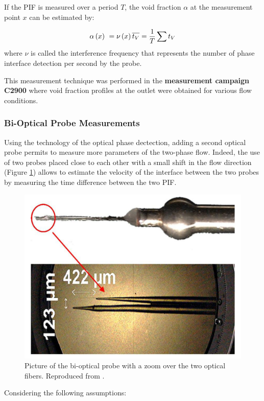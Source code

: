 If the PIF is measured over a period $T$, the void fraction $\alpha$ at the measurement point $x$ can be estimated by:


\begin{equation}
\alpha\left( x \right)\ = \nu\left( x \right) \overline{t_{V}} = \frac{1}{T} \sum t_{V}
\end{equation}
where $\nu$ is called the interference frequency that represents the number of phase interface detection per second by the probe.

\begin{remark*}{}
This measurement technique was performed in the \textbf{measurement campaign C2900} where void fraction profiles at the outlet were obtained for various flow conditions.
\end{remark*}

\subsubsection{Bi-Optical Probe Measurements}


Using the technology of the optical phase dectection, adding a second optical probe permits to measure more parameters of the two-phase flow. Indeed, the use of two probes placed close to each other with a small shift in the flow direction (Figure \ref{fig:optical_probe}) allows to estimate the velocity of the interface between the two probes by measuring the time difference between the two PIF.


\begin{figure}[!h]
\centering
\includegraphics[width=0.65\linewidth]{img/DEBORA/optical_probe.png}
\caption{Picture of the bi-optical probe with a zoom over the two optical fibers. Reproduced from \cite{gueguen_phd}.}
\label{fig:optical_probe}
\end{figure}

\npar

Considering the following assumptions:

